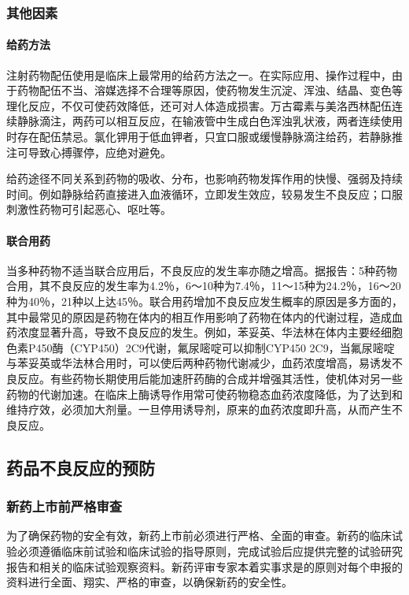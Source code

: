 \subsubsection{其他因素}
\paragraph{给药方法}

注射药物配伍使用是临床上最常用的给药方法之一。在实际应用、操作过程中，由于药物配伍不当、溶媒选择不合理等原因，使药物发生沉淀、浑浊、结晶、变色等理化反应，不仅可使药效降低，还可对人体造成损害。万古霉素与美洛西林配伍连续静脉滴注，两药可以相互反应，在输液管中生成白色浑浊乳状液，两者连续使用时存在配伍禁忌。氯化钾用于低血钾者，只宜口服或缓慢静脉滴注给药，若静脉推注可导致心搏骤停，应绝对避免。

给药途径不同关系到药物的吸收、分布，也影响药物发挥作用的快慢、强弱及持续时间。例如静脉给药直接进入血液循环，立即发生效应，较易发生不良反应；口服刺激性药物可引起恶心、呕吐等。
\paragraph{联合用药}

当多种药物不适当联合应用后，不良反应的发生率亦随之增高。据报告：5种药物合用，其不良反应的发生率为4.2％，6～10种为7.4％，11～15种为24.2％，16～20种为40％，21种以上达45％。联合用药增加不良反应发生概率的原因是多方面的，其中最常见的原因是药物在体内的相互作用影响了药物在体内的代谢过程，造成血药浓度显著升高，导致不良反应的发生。例如，苯妥英、华法林在体内主要经细胞色素P450酶（CYP450）2C9代谢，氟尿嘧啶可以抑制CYP450
2C9，当氟尿嘧啶与苯妥英或华法林合用时，可以使后两种药物代谢减少，血药浓度增高，易诱发不良反应。有些药物长期使用后能加速肝药酶的合成并增强其活性，使机体对另一些药物的代谢加速。在临床上酶诱导作用常可使药物稳态血药浓度降低，为了达到和维持疗效，必须加大剂量。一旦停用诱导剂，原来的血药浓度即升高，从而产生不良反应。

\subsection{药品不良反应的预防}

\subsubsection{新药上市前严格审查}

为了确保药物的安全有效，新药上市前必须进行严格、全面的审查。新药的临床试验必须遵循临床前试验和临床试验的指导原则，完成试验后应提供完整的试验研究报告和相关的临床试验观察资料。新药评审专家本着实事求是的原则对每个申报的资料进行全面、翔实、严格的审查，以确保新药的安全性。

